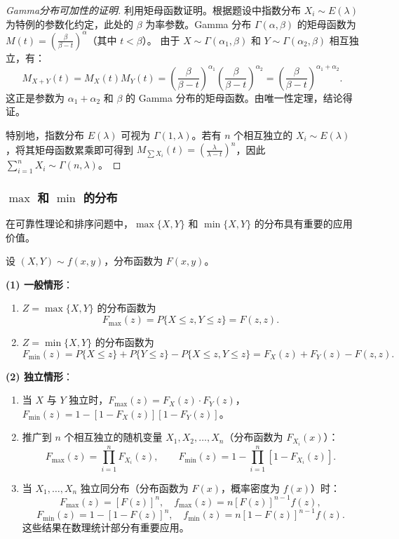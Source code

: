 ﻿\documentclass[lang=cn,11pt]{elegantbook}
\begin{document}
\begin{proof}[Gamma分布可加性的证明]
利用矩母函数证明。根据题设中指数分布 $X_i \sim E(\lambda)$ 为特例的参数化约定，此处的 $\beta$ 为率参数。Gamma 分布 $\Gamma(\alpha, \beta)$ 的矩母函数为 $M(t) = \left( \frac{\beta}{\beta-t} \right)^\alpha$（其中 $t < \beta$）。
由于 $X \sim \Gamma(\alpha_1, \beta)$ 和 $Y \sim \Gamma(\alpha_2, \beta)$ 相互独立，有：
\[
    M_{X+Y}(t) = M_X(t) M_Y(t) = \left( \frac{\beta}{\beta-t} \right)^{\alpha_1} \left( \frac{\beta}{\beta-t} \right)^{\alpha_2} = \left( \frac{\beta}{\beta-t} \right)^{\alpha_1+\alpha_2}.
\]
这正是参数为 $\alpha_1+\alpha_2$ 和 $\beta$ 的 Gamma 分布的矩母函数。由唯一性定理，结论得证。

特别地，指数分布 $E(\lambda)$ 可视为 $\Gamma(1, \lambda)$。若有 $n$ 个相互独立的 $X_i \sim E(\lambda)$，将其矩母函数累乘即可得到 $M_{\sum X_i}(t) = \left( \frac{\lambda}{\lambda-t} \right)^n$，因此 $\sum_{i=1}^{n}X_i \sim \Gamma(n, \lambda)$。
\end{proof}


\subsubsection{\texorpdfstring{$\max$ 和 $\min$ 的分布}{max 和 min 的分布}}

在可靠性理论和排序问题中，$\max\{X,Y\}$ 和 $\min\{X,Y\}$ 的分布具有重要的应用价值。

\begin{property}\label{prop:max-min-dist}
设 $(X,Y) \sim f(x,y)$，分布函数为 $F(x,y)$。

\textbf{(1) 一般情形}：
\begin{enumerate}
    \item $Z = \max\{X, Y\}$ 的分布函数为
    \[
    F_{\max}(z) = P\{X \leqslant z, Y \leqslant z\} = F(z, z).
    \]
    \item $Z = \min\{X, Y\}$ 的分布函数为
    \[
    F_{\min}(z) = P\{X \leqslant z\} + P\{Y \leqslant z\} - P\{X \leqslant z, Y \leqslant z\} = F_X(z) + F_Y(z) - F(z, z).
    \]
\end{enumerate}

\textbf{(2) 独立情形}：
\begin{enumerate}
    \item 当 $X$ 与 $Y$ 独立时，$F_{\max}(z) = F_X(z) \cdot F_Y(z)$，$F_{\min}(z) = 1 - [1 - F_X(z)][1 - F_Y(z)]$。
    \item 推广到 $n$ 个相互独立的随机变量 $X_1, X_2, \dots, X_n$（分布函数为 $F_{X_i}(x)$）：
    \[
    F_{\max}(z) = \prod_{i=1}^{n}F_{X_i}(z), \qquad F_{\min}(z) = 1 - \prod_{i=1}^{n}[1 - F_{X_i}(z)].
    \]
    \item 当 $X_1, \dots, X_n$ 独立同分布（分布函数为 $F(x)$，概率密度为 $f(x)$）时：
    \[
    F_{\max}(z) = [F(z)]^n, \quad f_{\max}(z) = n[F(z)]^{n-1}f(z),
    \]
    \[
    F_{\min}(z) = 1 - [1 - F(z)]^n, \quad f_{\min}(z) = n[1 - F(z)]^{n-1}f(z).
    \]
    这些结果在数理统计部分有重要应用。
\end{enumerate}
\end{property}
\end{document}
